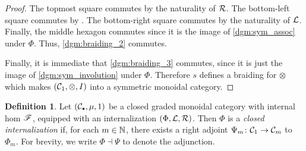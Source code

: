 \documentclass[openany, amssymb, psamsfonts]{amsart}
\theoremstyle{definition}
\newtheorem{defn}{Definition}[section]
\numberwithin{equation}{section}
\begin{document}
\begin{proof}
\vspace{0.5em}

\noindent The topmost square commutes by the naturality of $\mathcal{R}$. The bottom-left square commutes by . The bottom-right square commutes by the naturality of $\mathcal{L}$. Finally, the middle hexagon commutes since it is the image of \eqref{dgm:sym_assoc} under $\Phi$. Thus, \eqref{dgm:braiding_2} commutes.

Finally, it is immediate that \eqref{dgm:braiding_3} commutes, since it is just the image of \eqref{dgm:sym_involution} under $\Phi$. Therefore $s$ defines a braiding for $\otimes$ which makes $(\mathcal{C}_1, \otimes, I)$ into a symmetric monoidal category.
\end{proof}

\begin{defn} \label{def:closed_internalization}
Let $(\C_\sbull, \mu, 1)$ be a closed graded monoidal category with internal hom $\mathscr{F}$, equipped with an internalization $(\Phi, \mathcal{L}, \mathcal{R})$. Then $\Phi$ is a \emph{closed internalization} if, for each $m \in \mathbb{N}$, there exists a right adjoint $\Psi_m \colon \mathcal{C}_1 \to \mathcal{C}_m$ to $\Phi_m$. For brevity, we write $\Phi \dashv \Psi$ to denote the adjunction.
\end{defn}
\end{document}
